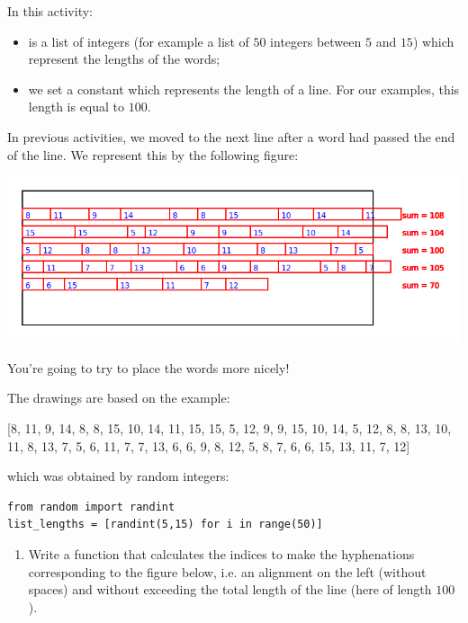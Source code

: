 \documentclass[11pt,class=report,crop=false]{standalone}
\begin{document}
\begin{activite}[Justification]



In this activity:
\begin{itemize}
 \item {} is a list of integers (for example a list of $50$ integers between $5$ and $15$) which represent the lengths of the words;
 \item we set a constant  which represents the length of a line. For our examples, this length is equal to $100$.
 \end{itemize}


In previous activities, we moved to the next line after a word had passed the end of the line.
We represent this by the following figure:
\begin{center}
\includegraphics[scale=0.5]{screen-hyphen-1}
\end{center} 
You're going to try to place the words more nicely!

The drawings are based on the example:
\begin{center}
 [8, 11, 9, 14, 8, 8, 15, 10, 14, 11, 15, 15, 5, 12, 9, 9, 15, 10, 14, 5, 12, 8, 8, 13, 10, 11, 8, 13, 7, 5, 6, 11, 7, 7, 13, 6, 6, 9, 8, 12, 5, 8, 7, 6, 6, 15, 13, 11, 7, 12]
\end{center}
which was obtained by random integers:
\begin{lstlisting}
from random import randint
list_lengths = [randint(5,15) for i in range(50)]
\end{lstlisting}


\begin{enumerate}
  \item Write a function  that calculates the indices to make the hyphenations corresponding to the figure below, i.e. an alignment on the left (without spaces) and without exceeding the total length of the line (here of length $100$).
  

\end{enumerate}
\end{activite}
\end{document}

